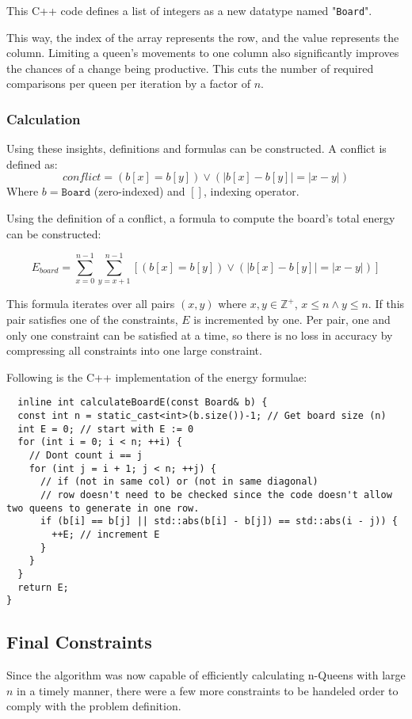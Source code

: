 \documentclass{article}
\begin{document}
This C++ code defines a list of integers as a new datatype named "\texttt{Board}".

This way, the index of the array represents the row, and the value represents the column.
Limiting a queen's movements to one column also significantly improves the chances of a change being productive.
This cuts the number of required comparisons per queen per iteration by a factor of $n$.

\subsubsection{Calculation}
Using these insights, definitions and formulas can be constructed.
A conflict is defined as:
\[
    conflict = (b[x] = b[y]) \lor (|b[x] - b[y]| = |x - y|)
\]
Where $b = \texttt{Board}$ (zero-indexed) and $[ ]$, indexing operator.

\clearpage
Using the definition of a conflict, a formula to compute the board's total energy can be constructed:

\[
    E_{board} = \sum_{x=0}^{n-1} \sum_{y=x+1}^{n-1} \left[ (b[x] = b[y]) \lor \left( \left| b[x] - b[y] \right| = \left| x - y \right| \right) \right]
\]

This formula iterates over all pairs $(x, y)$ where $x, y \in \mathbb{Z}^+$, $x \leq n \land y \leq n$.
If this pair satisfies one of the constraints, $E$ is incremented by one.
Per pair, one and only one constraint can be satisfied at a time, so there is no loss in accuracy by compressing all constraints into one large constraint.

Following is the C++ implementation of the energy formulae:

\begin{lstlisting}
  inline int calculateBoardE(const Board& b) {
  const int n = static_cast<int>(b.size())-1; // Get board size (n)
  int E = 0; // start with E := 0
  for (int i = 0; i < n; ++i) {
    // Dont count i == j
    for (int j = i + 1; j < n; ++j) {
      // if (not in same col) or (not in same diagonal)
      // row doesn't need to be checked since the code doesn't allow two queens to generate in one row.
      if (b[i] == b[j] || std::abs(b[i] - b[j]) == std::abs(i - j)) {
        ++E; // increment E
      }
    }
  }
  return E;
}
\end{lstlisting}

\subsection{Final Constraints}
Since the algorithm was now capable of efficiently calculating n-Queens with large $n$ in a timely manner,
there were a few more constraints to be handeled order to comply with the problem definition.
\end{document}
